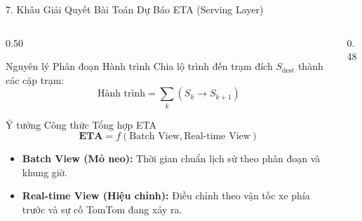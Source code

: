 \documentclass[aspectratio=169,10pt]{beamer}
\begin{document}
\begin{frame}{7. Khâu Giải Quyết Bài Toán Dự Báo ETA (Serving Layer)}
\begin{columns}[T]
    \begin{column}{0.50\textwidth}
        \begin{block}{Nguyên lý Phân đoạn Hành trình}
            \footnotesize
            Chia lộ trình đến trạm đích $S_{\text{dest}}$ thành các cặp trạm:
            $$\text{Hành trình} = \sum_{k} (S_k \to S_{k+1})$$
        \end{block}
        \vspace{1pt}
        \begin{block}{Ý tưởng Công thức Tổng hợp ETA}
            \footnotesize
            \begin{equation*}
                \mathbf{ETA} = f(\text{Batch View}, \text{Real-time View})
            \end{equation*}
            \begin{itemize}\setlength{\itemsep}{1.5pt}\scriptsize
                \item \textbf{Batch View (Mỏ neo):} Thời gian chuẩn lịch sử theo phân đoạn và khung giờ.
                \item \textbf{Real-time View (Hiệu chỉnh):} Điều chỉnh theo vận tốc xe phía trước và sự cố TomTom đang xảy ra.
            \end{itemize}
        \end{block}
    \end{column}

    \begin{column}{0.48\textwidth}
        \centering
\end{column}
\end{columns}
\end{frame}
\end{document}
